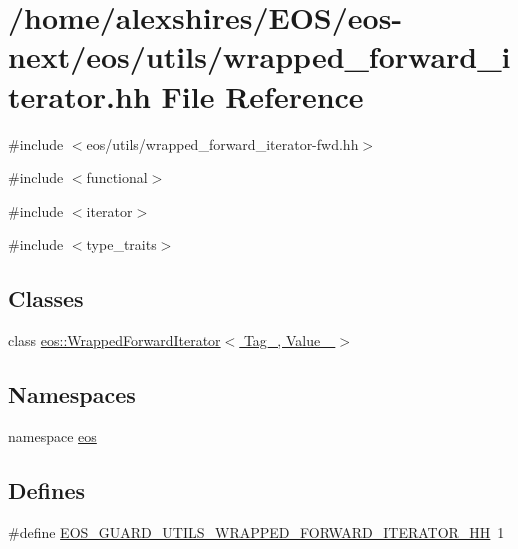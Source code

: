 \hypertarget{wrapped__forward__iterator_8hh}{
\section{/home/alexshires/EOS/eos-\/next/eos/utils/wrapped\_\-forward\_\-iterator.hh File Reference}
\label{wrapped__forward__iterator_8hh}
}
{\ttfamily \#include $<$eos/utils/wrapped\_\-forward\_\-iterator-\/fwd.hh$>$}\par
{\ttfamily \#include $<$functional$>$}\par
{\ttfamily \#include $<$iterator$>$}\par
{\ttfamily \#include $<$type\_\-traits$>$}\par
\subsection*{Classes}
\begin{DoxyCompactItemize}
\item 
class \hyperlink{classeos_1_1WrappedForwardIterator}{eos::WrappedForwardIterator$<$ Tag\_\-, Value\_\- $>$}
\end{DoxyCompactItemize}
\subsection*{Namespaces}
\begin{DoxyCompactItemize}
\item 
namespace \hyperlink{namespaceeos}{eos}
\end{DoxyCompactItemize}
\subsection*{Defines}
\begin{DoxyCompactItemize}
\item 
\#define \hyperlink{wrapped__forward__iterator_8hh_aba45de1b4a0ff3c586dddb739af59bbe}{EOS\_\-GUARD\_\-UTILS\_\-WRAPPED\_\-FORWARD\_\-ITERATOR\_\-HH}~1
\end{DoxyCompactItemize}


